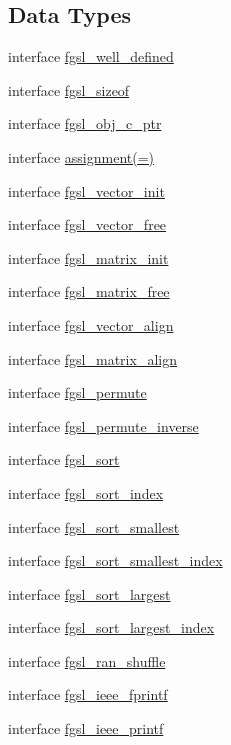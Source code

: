 \subsection*{Data Types}
\begin{DoxyCompactItemize}
\item 
interface \hyperlink{interfacefgsl__well__defined}{fgsl\-\_\-well\-\_\-defined}
\item 
interface \hyperlink{interfacefgsl__sizeof}{fgsl\-\_\-sizeof}
\item 
interface \hyperlink{interfacefgsl__obj__c__ptr}{fgsl\-\_\-obj\-\_\-c\-\_\-ptr}
\item 
interface \hyperlink{interfaceassignment_07_0A_08}{assignment(=)}
\item 
interface \hyperlink{interfacefgsl__vector__init}{fgsl\-\_\-vector\-\_\-init}
\item 
interface \hyperlink{interfacefgsl__vector__free}{fgsl\-\_\-vector\-\_\-free}
\item 
interface \hyperlink{interfacefgsl__matrix__init}{fgsl\-\_\-matrix\-\_\-init}
\item 
interface \hyperlink{interfacefgsl__matrix__free}{fgsl\-\_\-matrix\-\_\-free}
\item 
interface \hyperlink{interfacefgsl__vector__align}{fgsl\-\_\-vector\-\_\-align}
\item 
interface \hyperlink{interfacefgsl__matrix__align}{fgsl\-\_\-matrix\-\_\-align}
\item 
interface \hyperlink{interfacefgsl__permute}{fgsl\-\_\-permute}
\item 
interface \hyperlink{interfacefgsl__permute__inverse}{fgsl\-\_\-permute\-\_\-inverse}
\item 
interface \hyperlink{interfacefgsl__sort}{fgsl\-\_\-sort}
\item 
interface \hyperlink{interfacefgsl__sort__index}{fgsl\-\_\-sort\-\_\-index}
\item 
interface \hyperlink{interfacefgsl__sort__smallest}{fgsl\-\_\-sort\-\_\-smallest}
\item 
interface \hyperlink{interfacefgsl__sort__smallest__index}{fgsl\-\_\-sort\-\_\-smallest\-\_\-index}
\item 
interface \hyperlink{interfacefgsl__sort__largest}{fgsl\-\_\-sort\-\_\-largest}
\item 
interface \hyperlink{interfacefgsl__sort__largest__index}{fgsl\-\_\-sort\-\_\-largest\-\_\-index}
\item 
interface \hyperlink{interfacefgsl__ran__shuffle}{fgsl\-\_\-ran\-\_\-shuffle}
\item 
interface \hyperlink{interfacefgsl__ieee__fprintf}{fgsl\-\_\-ieee\-\_\-fprintf}
\item 
interface \hyperlink{interfacefgsl__ieee__printf}{fgsl\-\_\-ieee\-\_\-printf}
\end{DoxyCompactItemize}
